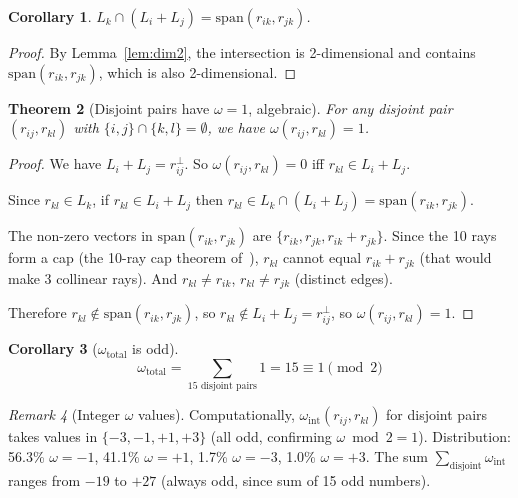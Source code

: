\documentclass[11pt,a4paper]{article}
\newtheorem{theorem}{Theorem}[section]
\newtheorem{corollary}[theorem]{Corollary}
\theoremstyle{remark}
\newtheorem{remark}[theorem]{Remark}
\begin{document}
\begin{corollary}
  $L_k \cap (L_i + L_j) = \text{span}(r_{ik}, r_{jk})$.
\end{corollary}

\begin{proof}
  By Lemma~\ref{lem:dim2}, the intersection is 2-dimensional and
  contains $\text{span}(r_{ik}, r_{jk})$, which is also 2-dimensional.
\end{proof}

\begin{theorem}[Disjoint pairs have $\omega = 1$, algebraic]
\label{thm:disjoint-omega}
  For any disjoint pair $(r_{ij}, r_{kl})$ with
  $\{i,j\} \cap \{k,l\} = \emptyset$, we have
  $\omega(r_{ij}, r_{kl}) = 1$.
\end{theorem}

\begin{proof}
  We have $L_i + L_j = r_{ij}^\perp$. So $\omega(r_{ij}, r_{kl}) = 0$
  iff $r_{kl} \in L_i + L_j$.

  Since $r_{kl} \in L_k$, if $r_{kl} \in L_i + L_j$ then
  $r_{kl} \in L_k \cap (L_i + L_j) = \text{span}(r_{ik}, r_{jk})$.

  The non-zero vectors in $\text{span}(r_{ik}, r_{jk})$ are
  $\{r_{ik}, r_{jk}, r_{ik} + r_{jk}\}$.   Since the 10 rays form a cap
  (the 10-ray cap theorem of~\cite{PaperX}), $r_{kl}$ cannot equal
  $r_{ik} + r_{jk}$ (that would make 3 collinear rays). And
  $r_{kl} \neq r_{ik}$, $r_{kl} \neq r_{jk}$ (distinct edges).

  Therefore $r_{kl} \notin \text{span}(r_{ik}, r_{jk})$, so
  $r_{kl} \notin L_i + L_j = r_{ij}^\perp$, so
  $\omega(r_{ij}, r_{kl}) = 1$.
\end{proof}

\begin{corollary}[$\omega_{\text{total}}$ is odd]
\label{cor:omega-odd}
  \[
  \omega_{\text{total}} = \sum_{\text{15 disjoint pairs}} 1 = 15 \equiv 1 \pmod{2}
  \]
\end{corollary}

\begin{remark}[Integer $\omega$ values]
  Computationally, $\omega_{\text{int}}(r_{ij}, r_{kl})$ for disjoint
  pairs takes values in $\{-3, -1, +1, +3\}$ (all odd, confirming
  $\omega \bmod 2 = 1$). Distribution: 56.3\% $\omega = -1$, 41.1\%
  $\omega = +1$, 1.7\% $\omega = -3$, 1.0\% $\omega = +3$. The sum
  $\sum_{\text{disjoint}} \omega_{\text{int}}$ ranges from $-19$ to
  $+27$ (always odd, since sum of 15 odd numbers).
\end{remark}
\end{document}

